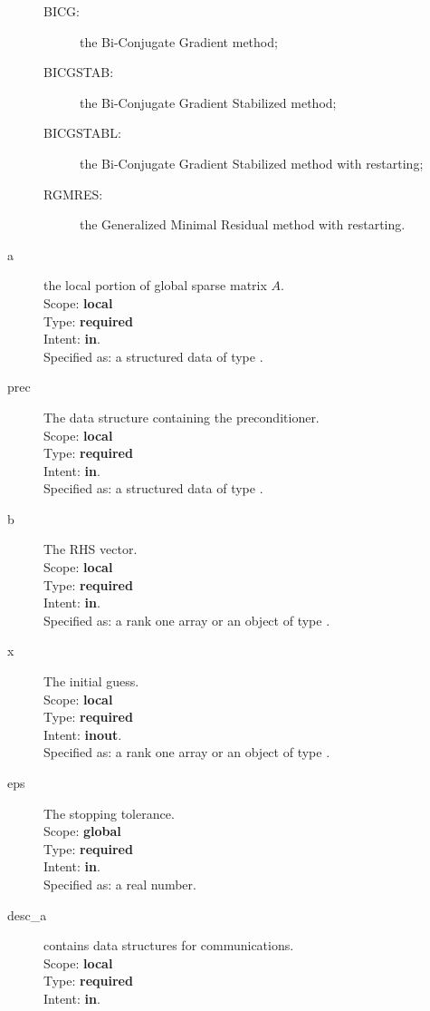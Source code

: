 \begin{description}
\begin{description}
  \item[BICG:] the Bi-Conjugate Gradient method;
  \item[BICGSTAB:] the Bi-Conjugate Gradient Stabilized method;
  \item[BICGSTABL:] the Bi-Conjugate Gradient Stabilized method with restarting;
  \item[RGMRES:] the Generalized Minimal Residual method with restarting.
  \end{description}
\item[a] the local portion of global sparse matrix
$A$. \\
Scope: {\bf local} \\
Type: {\bf required}\\
Intent: {\bf in}.\\
Specified as: a structured data of type \spdata.
\item[prec] The data structure containing the preconditioner.\\
Scope: {\bf local} \\
Type: {\bf required}\\
Intent: {\bf in}.\\
Specified as: a structured data of type \precdata.
\item[b] The RHS vector. \\
Scope: {\bf local} \\
Type: {\bf required}\\
Intent: {\bf in}.\\
Specified as:  a rank one array or an object of type \vdata.
\item[x] The initial guess. \\
Scope: {\bf local} \\
Type: {\bf required}\\
Intent: {\bf inout}.\\
Specified as:  a rank one array or an object of type \vdata.
\item[eps] The stopping tolerance. \\
Scope: {\bf global} \\
Type: {\bf required}\\
Intent: {\bf in}.\\
Specified as: a real number. 
\item[desc\_a] contains data structures for communications.\\
Scope: {\bf local} \\
Type: {\bf required}\\
Intent: {\bf in}.\\

\end{description}
